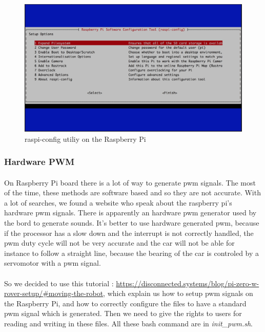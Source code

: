 \begin{figure}[!ht]
    \begin{center}
        \includegraphics[scale=0.3]{Images/Raspi_config.png}
    \end{center}
    \caption{raspi-config utiliy on the Raspberry Pi}
    \label{fig:raspi_config}
\end{figure}

\subsubsection{Hardware PWM}
\paragraph{}
On Raspberry Pi board there is a lot of way to generate pwm signals.
The most of the time, these methods are software based and so they are not
accurate. With a lot of searches, we found a website who speak about the
raspberry pi's hardware pwm signals. There is apparently an hardware pwm
generator used by the bord to generate sounds. It's better to use hardware 
generated pwm, because if the processor has a slow down and the interrupt
is not correctly handled, the pwm duty cycle will not be very accurate and
the car will not be able for instance to follow a straight line, because the
bearing of the car is controled by a servomotor with a pwm signal.

\paragraph{}So we decided to use this tutorial : \url{https://disconnected.systems/blog/pi-zero-w-rover-setup/#moving-the-robot}, 
which explain us how to setup pwm signals on the Raspberry Pi,
and how to correctly configure the files to have a standard pwm signal
which is generated. Then we need to give the rights to users for reading and
writing in these files. All these bash command are in \textit{init\_pwm.sh}.

